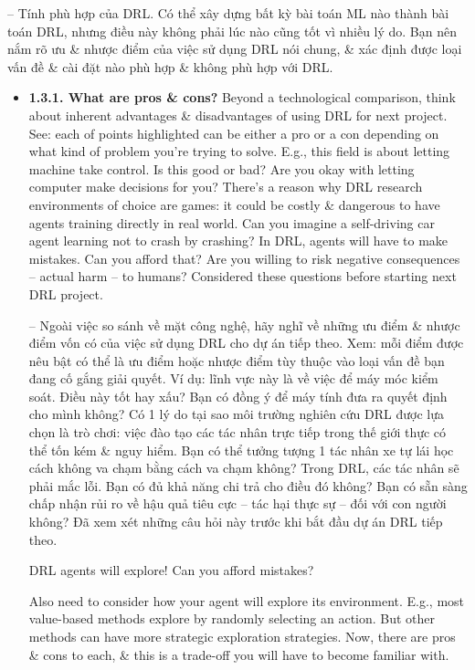 \documentclass{article}
\begin{document}
\begin{itemize}
\begin{itemize}
        -- {\sf Tính phù hợp của DRL.} Có thể xây dựng bất kỳ bài toán ML nào thành bài toán DRL, nhưng điều này không phải lúc nào cũng tốt vì nhiều lý do. Bạn nên nắm rõ ưu \& nhược điểm của việc sử dụng DRL nói chung, \& xác định được loại vấn đề \& cài đặt nào phù hợp \& không phù hợp với DRL.
        \begin{itemize}
            \item {\bf1.3.1. What are pros \& cons?} Beyond a technological comparison, think about inherent advantages \& disadvantages of using DRL for next project. See: each of points highlighted can be either a pro or a con depending on what kind of problem you're trying to solve. E.g., this field is about letting machine take control. Is this good or bad? Are you okay with letting computer make decisions for you? There's a reason why DRL research environments of choice are games: it could be costly \& dangerous to have agents training directly in real world. Can you imagine a self-driving car agent learning not to crash by crashing? In DRL, agents will have to make mistakes. Can you afford that? Are you willing to risk negative consequences -- actual harm -- to humans? Considered these questions before starting next DRL project.

            -- Ngoài việc so sánh về mặt công nghệ, hãy nghĩ về những ưu điểm \& nhược điểm vốn có của việc sử dụng DRL cho dự án tiếp theo. Xem: mỗi điểm được nêu bật có thể là ưu điểm hoặc nhược điểm tùy thuộc vào loại vấn đề bạn đang cố gắng giải quyết. Ví dụ: lĩnh vực này là về việc để máy móc kiểm soát. Điều này tốt hay xấu? Bạn có đồng ý để máy tính đưa ra quyết định cho mình không? Có 1 lý do tại sao môi trường nghiên cứu DRL được lựa chọn là trò chơi: việc đào tạo các tác nhân trực tiếp trong thế giới thực có thể tốn kém \& nguy hiểm. Bạn có thể tưởng tượng 1 tác nhân xe tự lái học cách không va chạm bằng cách va chạm không? Trong DRL, các tác nhân sẽ phải mắc lỗi. Bạn có đủ khả năng chi trả cho điều đó không? Bạn có sẵn sàng chấp nhận rủi ro về hậu quả tiêu cực -- tác hại thực sự -- đối với con người không? Đã xem xét những câu hỏi này trước khi bắt đầu dự án DRL tiếp theo.

            {\sf DRL agents will explore! Can you afford mistakes?}

            Also need to consider how your agent will explore its environment. E.g., most value-based methods explore by randomly selecting an action. But other methods can have more strategic exploration strategies. Now, there are pros \& cons to each, \& this is a trade-off you will have to become familiar with.


\end{itemize}
\end{itemize}
\end{itemize}
\end{document}
